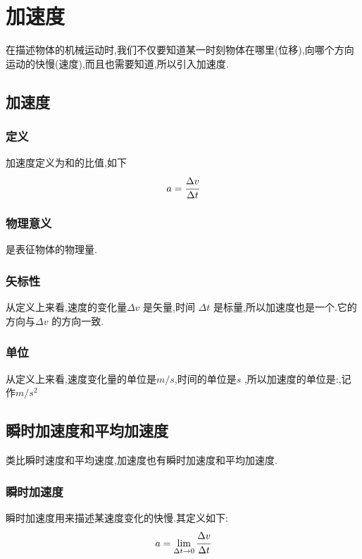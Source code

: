 \section{加速度}
在描述物体的机械运动时,我们不仅要知道某一时刻物体在哪里(位移),向哪个方向运动的快慢(速度),而且也需要知道,所以引入加速度.

\subsection{加速度}
\subsubsection{定义}
加速度定义为和的比值,如下
\begin{equation}
  a=\cfrac{\Delta v}{\Delta t} \label{eq:acceleration}
\end{equation}

\subsubsection{物理意义}
是表征物体的物理量.

\subsubsection{矢标性}
从定义上来看,速度的变化量$\Delta v$ 是矢量,时间 $\Delta t$ 是标量,所以加速度也是一个.它的方向与$\Delta v$ 的方向一致.
\subsubsection{单位}
从定义上来看,速度变化量的单位是$m/s$,时间的单位是$s$ ,所以加速度的单位是:,记作$m/s^2$

\subsection{瞬时加速度和平均加速度}
类比瞬时速度和平均速度,加速度也有瞬时加速度和平均加速度.

\subsubsection{瞬时加速度}
瞬时加速度用来描述某速度变化的快慢.其定义如下:
\begin{equation}
a=\lim_{\Delta t \to 0} \cfrac{\Delta v}{\Delta t}
  \label{eq:instantaneous acceleration}
\end{equation}

